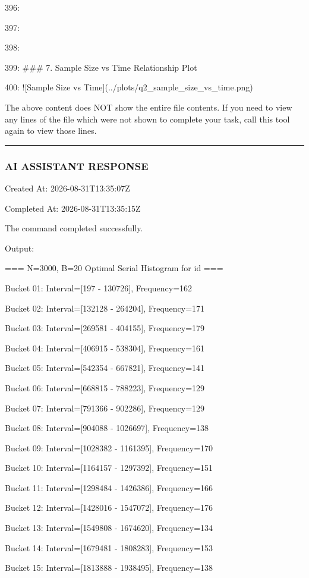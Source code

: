 \documentclass[11pt,a4paper]{article}
\begin{document}
{396:

397:

398:

399: \#\#\# 7. Sample Size vs Time Relationship Plot

400: ![Sample Size vs Time](../plots/q2\_sample\_size\_vs\_time.png)

The above content does NOT show the entire file contents. If you need to view any lines of the file which were not shown to complete your task, call this tool again to view those lines.


\hrule

\subsubsection{AI ASSISTANT RESPONSE}

Created At: 2026-08-31T13:35:07Z

Completed At: 2026-08-31T13:35:15Z


The command completed successfully.

Output:

=== N=3000, B=20 Optimal Serial Histogram for id ===

Bucket 01: Interval=[197 - 130726], Frequency=162

Bucket 02: Interval=[132128 - 264204], Frequency=171

Bucket 03: Interval=[269581 - 404155], Frequency=179

Bucket 04: Interval=[406915 - 538304], Frequency=161

Bucket 05: Interval=[542354 - 667821], Frequency=141

Bucket 06: Interval=[668815 - 788223], Frequency=129

Bucket 07: Interval=[791366 - 902286], Frequency=129

Bucket 08: Interval=[904088 - 1026697], Frequency=138

Bucket 09: Interval=[1028382 - 1161395], Frequency=170

Bucket 10: Interval=[1164157 - 1297392], Frequency=151

Bucket 11: Interval=[1298484 - 1426386], Frequency=166

Bucket 12: Interval=[1428016 - 1547072], Frequency=176

Bucket 13: Interval=[1549808 - 1674620], Frequency=134

Bucket 14: Interval=[1679481 - 1808283], Frequency=153

Bucket 15: Interval=[1813888 - 1938495], Frequency=138

}
\end{document}
